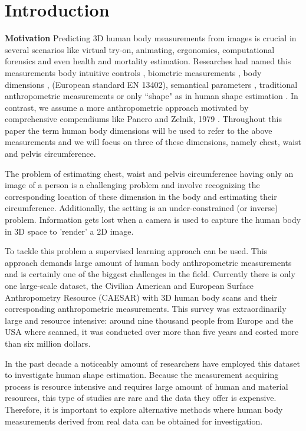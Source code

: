 \documentclass[runningheads, orivec]{llncs}
\begin{document}
\section{Introduction}\label{sec:intro}
\textbf{Motivation} 
Predicting 3D human body measurements from images is crucial in several 
scenarios 
like virtual try-on, animating, ergonomics, computational forensics and 
even health and mortality estimation. Researches had 
named this 
measurements body intuitive controls \cite{Allen.2003}, biometric 
measurements \cite{Sigal.2008}, body dimensions 
\cite{DBLP:conf/bmvc/ChenRC11}, (European standard EN 13402), semantical 
parameters \cite{Yang.2014}, 
traditional anthropometric 
measurements 
\cite{Wuhrer2011} or only ``shape" as in human shape estimation 
\cite{Guan.2013,Bogo:ECCV:2016,Loper.2015,Dibra.2016a,Pishchulin.2017}. In 
contrast, we assume a more 
anthropometric approach 
motivated by comprehensive compendiums like Panero and Zelnik, 1979 
\cite{panero1979human}.
Throughout this paper the term human body 
dimensions 
will be used to refer to the above measurements and we will focus on three of 
these dimensions, namely chest, waist and 
pelvis circumference.

The problem of estimating chest, waist and 
pelvis circumference having only an image of a person is a challenging problem 
and involve recognizing the corresponding location of these dimension in the 
body and estimating their circumference. Additionally, the setting is an  
under-constrained  (or inverse) problem. Information 
gets lost when a camera is 
used to capture the human body in 3D space to 'render' a 2D image. 

To tackle this problem a supervised learning approach can be used. This approach
demands large amount of human body anthropometric measurements and is certainly 
one of the biggest challenges in the field.  Currently there 
is only one large-scale dataset, the Civilian American and 
European Surface Anthropometry Resource (CAESAR) \cite{robinette1999caesar} 
with 3D human body scans and their corresponding anthropometric measurements. 
This survey was extraordinarily large and resource intensive: around nine 
thousand people from Europe and the USA where scanned, it was conducted over 
more than five years and costed more than six million dollars.

In the past decade a noticeably amount of researchers have employed this 
dataset to investigate human shape estimation. Because the measurement 
acquiring process is resource intensive and requires large amount of human and 
material resources, this type of studies are rare and the data they offer is 
expensive. Therefore, it is important to explore alternative methods where 
human body measurements derived from real data can be obtained for 
investigation.
\end{document}
